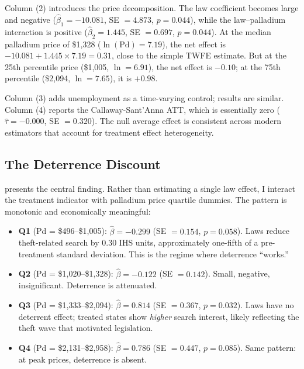 \documentclass[12pt]{article}
\begin{document}
Column (2) introduces the price decomposition. The law coefficient becomes large and negative ($\hat{\beta}_1 = -10.081$, SE $= 4.873$, $p = 0.044$), while the law--palladium interaction is positive ($\hat{\beta}_2 = 1.445$, SE $= 0.697$, $p = 0.044$). At the median palladium price of \$1,328 ($\ln(\text{Pd}) = 7.19$), the net effect is $-10.081 + 1.445 \times 7.19 = 0.31$, close to the simple TWFE estimate. But at the 25th percentile price (\$1,005, $\ln = 6.91$), the net effect is $-0.10$; at the 75th percentile (\$2,094, $\ln = 7.65$), it is $+0.98$.

Column (3) adds unemployment as a time-varying control; results are similar. Column (4) reports the Callaway-Sant'Anna ATT, which is essentially zero ($\hat{\tau} = -0.000$, SE $= 0.320$). The null average effect is consistent across modern estimators that account for treatment effect heterogeneity.



\subsection{The Deterrence Discount}

 presents the central finding. Rather than estimating a single law effect, I interact the treatment indicator with palladium price quartile dummies. The pattern is monotonic and economically meaningful:

\begin{itemize}
\item \textbf{Q1} (Pd = \$496--\$1,005): $\hat{\beta} = -0.299$ (SE $= 0.154$, $p = 0.058$). Laws reduce theft-related search by 0.30 IHS units, approximately one-fifth of a pre-treatment standard deviation. This is the regime where deterrence ``works.''
\item \textbf{Q2} (Pd = \$1,020--\$1,328): $\hat{\beta} = -0.122$ (SE $= 0.142$). Small, negative, insignificant. Deterrence is attenuated.
\item \textbf{Q3} (Pd = \$1,333--\$2,094): $\hat{\beta} = 0.814$ (SE $= 0.367$, $p = 0.032$). Laws have no deterrent effect; treated states show \textit{higher} search interest, likely reflecting the theft wave that motivated legislation.
\item \textbf{Q4} (Pd = \$2,131--\$2,958): $\hat{\beta} = 0.786$ (SE $= 0.447$, $p = 0.085$). Same pattern: at peak prices, deterrence is absent.
\end{itemize}
\end{document}
